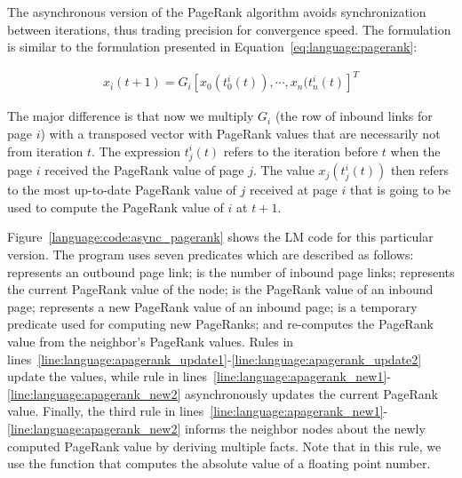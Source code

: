 The asynchronous version of the PageRank algorithm avoids synchronization
between iterations, thus trading precision for convergence speed.  The
formulation is similar to the formulation presented in
Equation~\ref{eq:language:pagerank}:

\begin{align}
x_{i}(t + 1) = G_{i} [x_{0}(t^{i}_{0}(t)), \cdots, x_{n}(t^{i}_{n}(t)]^{T}\label{eq:appendix:pagerank_async}
\end{align}

The major difference is that now we multiply $G_{i}$ (the row of inbound links
for page $i$) with a transposed vector with PageRank values that are necessarily
not from iteration $t$. The expression $t^{i}_{j}(t)$ refers to the iteration
before $t$ when the page $i$ received the PageRank value of page $j$. The value
$x_{j}(t^{i}_{j}(t))$ then refers to the most up-to-date PageRank value of $j$
received at page $i$ that is going to be used to compute the PageRank value of
$i$ at $t + 1$.

Figure~\ref{language:code:async_pagerank} shows the LM code for this particular
version. The program uses seven predicates which are described as follows:
 represents an outbound page link;  is the
number of inbound page links;  represents the current PageRank
value of the node;  is the PageRank value of an inbound
page;  represents a new PageRank value of an inbound
page;  is a temporary predicate used for computing new
PageRanks; and  re-computes the PageRank value from the neighbor's
PageRank values. Rules in
lines~\ref{line:language:apagerank_update1}-\ref{line:language:apagerank_update2}
update the  values, while rule in
lines~\ref{line:language:apagerank_new1}-\ref{line:language:apagerank_new2}
asynchronously updates the current PageRank value. Finally, the third rule in
lines~\ref{line:language:apagerank_new1}-\ref{line:language:apagerank_new2}
informs the neighbor nodes about the newly computed PageRank value by deriving
multiple  facts. Note that in this rule, we use the
function  that computes the absolute value of a floating point
number.

